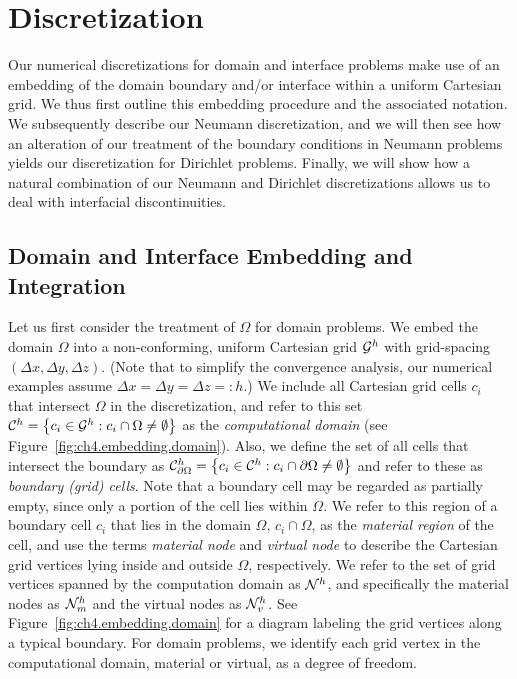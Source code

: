 \section{Discretization} \label{sec:ch4.discretization}

Our numerical discretizations for domain and interface problems make use of an embedding of the domain boundary and/or interface within a uniform Cartesian grid. We thus first outline this embedding procedure and the associated notation. We subsequently describe our Neumann discretization, and we will then see how an alteration of our treatment of the boundary conditions in Neumann problems yields our discretization for Dirichlet problems. Finally, we will show how a natural combination of our Neumann and Dirichlet discretizations allows us to deal with interfacial discontinuities.

\subsection{Domain and Interface Embedding and Integration} \label{subsec:ch4.discretization.embedding}

Let us first consider the treatment of $\Omega$ for domain problems. We embed the domain $\Omega$ into a non-conforming, uniform Cartesian grid $\mathcal{G}^h$ with grid-spacing $(\Delta x, \Delta y, \Delta z)$. (Note that to simplify the convergence analysis, our numerical examples assume $\Delta x = \Delta y = \Delta z =: h$.) We include all Cartesian grid cells $c_i$ that intersect $\Omega$ in the discretization, and refer to this set $\mathcal{C}^h = \left\lbrace  c_i \in \mathcal{G}^h : c_i \cap \Omega \neq \emptyset  \right\rbrace$ as the \emph{computational domain} (see Figure~\ref{fig:ch4.embedding.domain}). Also, we define the set of all cells that intersect the boundary as $\mathcal{C}_{\partial\Omega}^h = \left\lbrace  c_i \in \mathcal{C}^h : c_i \cap \partial\Omega \neq \emptyset  \right\rbrace$ and refer to these as \emph{boundary (grid) cells}. Note that a boundary cell may be regarded as partially empty, since only a portion of the cell lies within $\Omega$. We refer to this region of a boundary cell $c_i$ that lies in the domain $\Omega$, $c_i \cap \Omega$, as the \emph{material region} of the cell, and use the terms \emph{material node} and \emph{virtual node} to describe the Cartesian grid vertices lying inside and outside $\Omega$, respectively. We refer to the set of grid vertices spanned by the computation domain as $\mathcal{N}^h$, and specifically the material nodes as $\mathcal{N}^h_m$ and the virtual nodes as $\mathcal{N}^h_v$. See Figure~\ref{fig:ch4.embedding.domain} for a diagram labeling the grid vertices along a typical boundary. For domain problems, we identify each grid vertex in the computational domain, material or virtual, as a degree of freedom.

